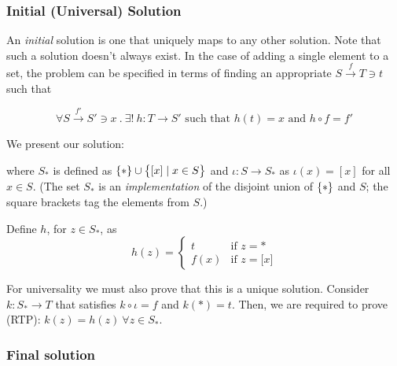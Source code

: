 \subsubsection*{Initial (Universal) Solution}

An \emph{initial} solution is one that uniquely maps to any other solution.
Note that such a solution doesn't always exist. In the case of adding a single
element to a set, the problem can be specified in terms of finding an
appropriate $S \overset{f}{\rightarrow} T \ni t$ such that

\begin{equation*}
  \forall S \overset{f'}{\rightarrow} S' \ni x \ .\
  \exists!\ h : T \rightarrow S' \text{ such that }
  h(t) = x \text{ and }
  h \circ f = f'
\end{equation*}

We present our solution:
\begin{center}
\end{center}

where $S_\ast$ is defined as
$\{  \ast  \} \cup \big\{  \lbrack x\rbrack \mid x \in S  \big\}$
and $\iota: S \to S_\ast$ as $\iota(x)=[x]$ for all $x\in S$.
%
(The set $S_\ast$ is an \emph{implementation} of the disjoint union of
$\{ * \}$ and $S$; the square brackets tag the elements from $S$.)

Define $h$, for $z\in S_\ast$, as
\begin{equation*}
    h(z) = \begin{cases}
        t & \text{if } z = \ast\\
        f(x) & \text{if } z = \lbrack x \rbrack
    \end{cases}
\end{equation*}

For universality we must also prove that this is a unique solution.
Consider $k:S_\ast\to T$ that satisfies $k \circ \iota = f$ and
$k(\ast) = t$. Then, we are required to prove (RTP):
$k(z) = h(z)\ \forall z \in S_\ast$.

\subsubsection*{Final solution}

